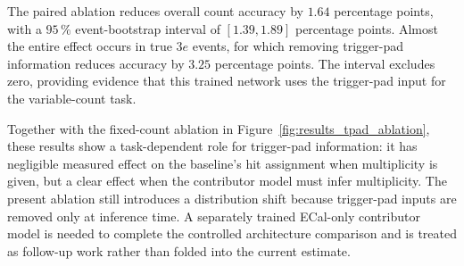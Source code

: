 The paired ablation reduces overall count accuracy by \(1.64\) percentage
points, with a \(95\,\%\) event-bootstrap interval of
\([1.39,1.89]\) percentage points. Almost the entire effect occurs in true
\(3e\) events, for which removing trigger-pad information reduces accuracy by
\(3.25\) percentage points. The interval excludes zero, providing evidence
that this trained network uses the trigger-pad input for the variable-count
task.

Together with the fixed-count ablation in
Figure~\ref{fig:results_tpad_ablation}, these results show a task-dependent
role for trigger-pad information: it has negligible measured effect on the
baseline's hit assignment when multiplicity is given, but a clear effect when
the contributor model must infer multiplicity. The present ablation still
introduces a distribution shift because trigger-pad inputs are removed only at
inference time. A separately trained ECal-only contributor model is needed to
complete the controlled architecture comparison and is treated as follow-up
work rather than folded into the current estimate.

